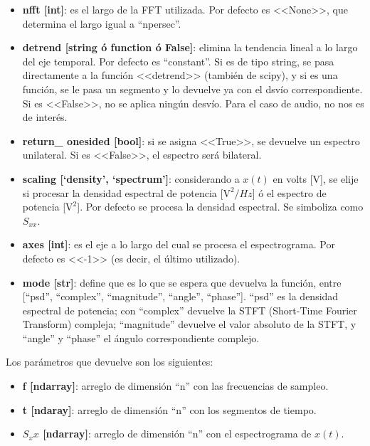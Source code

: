 \documentclass[assd_tp2_main.tex]{subfiles}
\begin{document}
\begin{itemize}
\item \textbf{nfft [int]}: es el largo de la FFT utilizada. Por defecto es <<None>>, que determina el largo igual a ``npersec''.

\item \textbf{detrend [string \'o function \'o False]}: elimina la tendencia lineal a lo largo del eje temporal. Por defecto es ``constant''. Si es de tipo string, se pasa directamente a la funci\'on <<detrend>> (tambi\'en de scipy), y si es una funci\'on, se le pasa un segmento y lo devuelve ya con el dsv\'io correspondiente. Si es <<False>>, no se aplica ning\'un desv\'io. Para el caso de audio, no nos es de inter\'es.

\item \textbf{return\_ onesided [bool]}: si se asigna <<True>>, se devuelve un espectro unilateral. Si es <<False>>, el espectro ser\'a bilateral.

\item \textbf{scaling [‘density’, ‘spectrum’]}: considerando a $x(t)$ en volts [V], se elije si procesar la densidad espectral de potencia [$\textrm{V}^2/Hz$] \'o el espectro de potencia [$\textrm{V}^2$]. Por defecto se procesa la densidad espectral. Se simboliza como $S_{xx}$.

\item \textbf{axes [int]}: es el eje a lo largo del cual se procesa el espectrograma. Por defecto es <<-1>> (es decir, el \'ultimo utilizado).

\item \textbf{mode [str]}: define que es lo que se espera que devuelva la funci\'on, entre [``psd'', ``complex'', ``magnitude'', ``angle'', ``phase'']. ``psd'' es la densidad espectral de potencia; con ``complex'' devuelve la STFT (Short-Time Fourier Transform) compleja; ``magnitude'' devuelve el valor absoluto de la STFT, y ``angle'' y ``phase'' el \'angulo correspondiente complejo.

\end{itemize}

Los par\'ametros que devuelve son los siguientes:

\begin{itemize}

\item \textbf{f [ndarray]}: arreglo de dimensi\'on ``n'' con las frecuencias de sampleo.

\item \textbf{t [ndaray]}: arreglo de dimensi\'on ``n'' con los segmentos de tiempo.

\item \textbf{$S_xx$ [ndarray]}: arreglo de dimensi\'on ``n'' con el espectrograma de $x(t)$.

\end{itemize}
\end{document}
